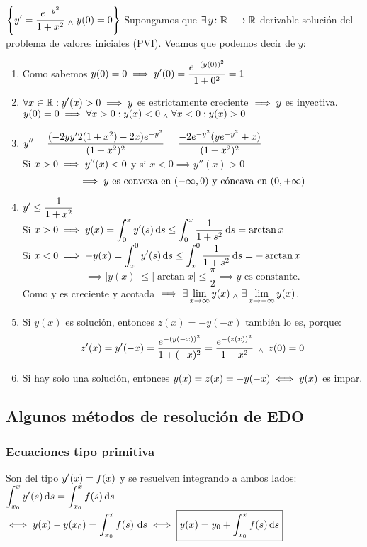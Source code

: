 \documentclass[12pt]{article}
\begin{document}
\begin{ejem}
    $\displaystyle \left\{y' = \frac{e^{-y^2}}{1+x^2} \; _{\wedge} \; y(0)=0\right\}$
    Supongamos que $\displaystyle\exists\,y \colon \mathbb{R} \longrightarrow \mathbb{R}$ derivable solución del problema de valores iniciales (PVI). Veamos que podemos decir de $y$:
    \begin{enumerate}
        \item Como sabemos $\displaystyle y(0)=0 \implies y'(0)=\frac{e^{-(y(0))^2}}{1+0^2}=1$
        \item $\displaystyle \forall x \in \mathbb{R} : y'(x)>0 \implies y$ es estrictamente creciente $\displaystyle\implies y$ es inyectiva. \\
        $\displaystyle y(0)=0 \implies \forall x>0 : y(x)<0 \; _{\wedge} \; \forall x<0 : y(x)>0$
        \item $\displaystyle y''=\frac{(-2yy'2(1+x^2)-2x)e^{-y^2}}{(1+x^2)^2}=\frac{-2e^{-y^2}(ye^{-y^2}+x)}{(1+x^2)^2}$ \\
        Si $\displaystyle x>0 \implies y''(x)<0$ y si $x<0 \implies y''(x)>0$
        \[ \implies y \text{ es convexa en } (-\infty, 0) \text{ y cóncava en }(0, +\infty)\]
        \item $\displaystyle y'\leq \frac{1}{1+x^2}$ \\
        Si $\ds x>0 \implies y(x)=\int_0^x y'(s)\odif{s}\leq\int_0^x \frac{1}{1+s^2}\odif{s}=\arctan{x}$ \\
        Si $\ds x<0 \implies -y(x)=\int_x^0 y'(s)\odif{s}\leq\int_x^0 \frac{1}{1+s^2}\odif{s}=-\arctan{x}$ \\
        \[\implies |y(x)| \leq |\arctan{x}| \leq \frac{\pi}{2} \implies y \text{ es constante.}\]
        Como y es creciente y acotada $\displaystyle\implies \exists\lim_{x\to\infty} y(x) \; _{\wedge} \; \exists\lim_{x\to-\infty} y(x)$.
        \item Si $y(x)$ es solución, entonces $z(x)=-y(-x)$ también lo es, porque:
        \[z'(x)=y'(-x)=\frac{e^{-(y(-x))^2}}{1+(-x)^2}=\frac{e^{-(z(x))^2}}{1+x^2} \,\; _{\wedge} \; \, z(0)=0\]
        \item Si hay solo una solución, entonces $\displaystyle y(x)=z(x)=-y(-x)\iff y(x)$ es impar.
    \end{enumerate}
    \ifdraft{\vspace{5cm}}{}
\end{ejem}
\subsection{Algunos métodos de resolución de EDO}
\subsubsection{Ecuaciones tipo primitiva}
Son del tipo $\displaystyle y'(x)=f(x)$ y se resuelven integrando a ambos lados: $\ds \int_{x_0}^x y'(s)\odif{s}=\int_{x_0}^x f(s) \odif{s}$
$\ds \iff y(x)-y(x_0)=\int_{x_0}^x f(s) \,\odif{s} \iff \boxed{y(x) = y_0 + \int_{x_0}^x f(s)\odif{s}}$
\end{document}
